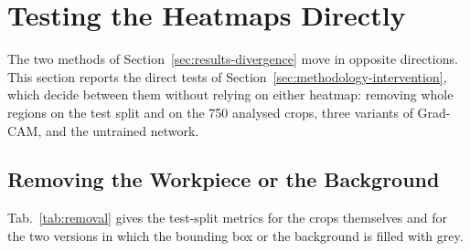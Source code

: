 \FloatBarrier
\section{Testing the Heatmaps Directly}
\label{sec:results-intervention}

The two methods of Section~\ref{sec:results-divergence} move in opposite directions. This
section reports the direct tests of Section~\ref{sec:methodology-intervention}, which
decide between them without relying on either heatmap: removing whole regions on the
test split and on the 750 analysed crops, three variants of Grad-CAM, and the untrained
network.

\subsection{Removing the Workpiece or the Background}
\label{sec:results-removal}

Tab.~\ref{tab:removal} gives the test-split metrics for the crops themselves and for the
two versions in which the bounding box or the background is filled with grey.

